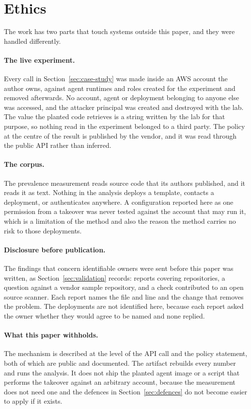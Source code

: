 \section{Ethics}
\label{sec:ethics}

The work has two parts that touch systems outside this paper, and they were
handled differently.

\paragraph{The live experiment.}
Every call in Section~\ref{sec:case-study} was made inside an AWS account the
author owns, against agent runtimes and roles created for the experiment and
removed afterwards. No account, agent or deployment belonging to anyone else
was accessed, and the attacker principal was created and destroyed with the
lab. The value the planted code retrieves is a string written by the lab for
that purpose, so nothing read in the experiment belonged to a third party. The
policy at the centre of the result is published by the vendor, and it was read
through the public API rather than inferred.

\paragraph{The corpus.}
The prevalence measurement reads source code that its authors published, and
it reads it as text. Nothing in the analysis deploys a template, contacts a
deployment, or authenticates anywhere. A configuration reported here as one
permission from a takeover was never tested against the account that may run
it, which is a limitation of the method and also the reason the method carries
no risk to those deployments.

\paragraph{Disclosure before publication.}
The findings that concern identifiable owners were sent before this paper was
written, as Section~\ref{sec:validation} records: \nDisclosureReports reports
covering \nDisclosureRepos repositories, a question against a vendor sample
repository, and a check contributed to an open source scanner. Each report
names the file and line and the change that removes the problem. The
deployments are not identified here, because each report asked the owner
whether they would agree to be named and none replied.

\paragraph{What this paper withholds.}
The mechanism is described at the level of the API call and the policy
statement, both of which are public and documented. The artifact rebuilds
every number and runs the analysis. It does not ship the planted agent image
or a script that performs the takeover against an arbitrary account, because
the measurement does not need one and the defences in
Section~\ref{sec:defences} do not become easier to apply if it exists.
